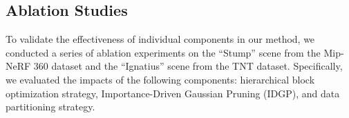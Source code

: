 \subsection{Ablation Studies}




To validate the effectiveness of individual components in our method, we conducted a series of ablation experiments on the ``Stump'' scene from the Mip-NeRF 360 dataset and the ``Ignatius'' scene from the TNT dataset. Specifically, we evaluated the impacts of the following components: hierarchical block optimization strategy, Importance-Driven Gaussian Pruning (IDGP), and data partitioning strategy.



